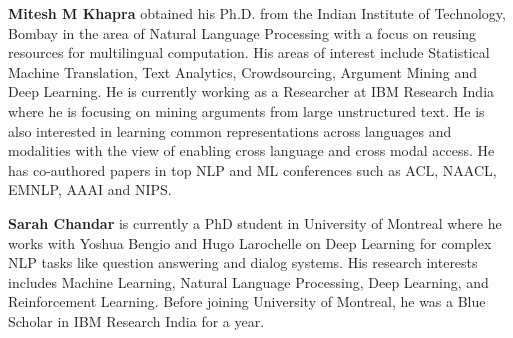 \begin{bio}
{\bfseries Mitesh M Khapra} obtained his Ph.D. from the Indian Institute of Technology, Bombay in the area of Natural Language Processing with a focus on reusing resources for multilingual computation. His areas of interest include Statistical Machine Translation, Text Analytics, Crowdsourcing, Argument Mining and Deep Learning. He is currently working as a Researcher at IBM Research India where he is focusing on mining arguments from large unstructured text. He is also interested in learning common representations across languages and modalities with the view of enabling cross language and cross modal access. He has co-authored papers in top NLP and ML conferences such as ACL, NAACL, EMNLP, AAAI and NIPS.

{\bfseries Sarah Chandar} is currently a PhD student in University of Montreal where he works with Yoshua Bengio and Hugo Larochelle on Deep Learning for complex NLP tasks like question answering and dialog systems. His research interests includes Machine Learning, Natural Language Processing, Deep Learning, and Reinforcement Learning. Before joining University of Montreal, he was a Blue Scholar in IBM Research India for a year.
\end{bio}

